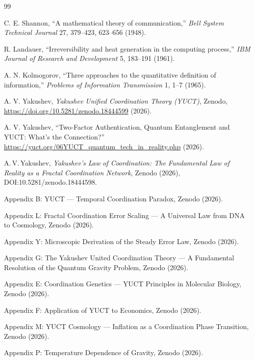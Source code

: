 \documentclass[12pt,a4paper]{article}
\theoremstyle{remark}
\begin{document}
	\begin{thebibliography}{99}
		
		C. E. Shannon, ``A mathematical theory of communication,'' \emph{Bell System Technical Journal} 27, 379--423, 623--656 (1948).
		
		R. Landauer, ``Irreversibility and heat generation in the computing process,'' \emph{IBM Journal of Research and Development} 5, 183--191 (1961).
		
		A. N. Kolmogorov, ``Three approaches to the quantitative definition of information,'' \emph{Problems of Information Transmission} 1, 1--7 (1965).
		
		A. V. Yakushev, \emph{Yakushev Unified Coordination Theory (YUCT)}, Zenodo, \url{https://doi.org/10.5281/zenodo.18444599} (2026).
		
		A. V. Yakushev, ``Two-Factor Authentication, Quantum Entanglement and YUCT: What's the Connection?'' \url{https://yuct.org/06YUCT_quantum_tech_in_reality.php} (2026).
		
		A.\,V.\,Yakushev, \emph{Yakushev's Law of Coordination: The Fundamental Law
			of Reality as a Fractal Coordination Network}, Zenodo (2026),
		DOI:10.5281/zenodo.18444598.
		
		Appendix B: YUCT --- Temporal Coordination Paradox, Zenodo (2026).
		
		Appendix L: Fractal Coordination Error Scaling --- A Universal Law from DNA to Cosmology, Zenodo (2026).
		
		Appendix Y: Microscopic Derivation of the Steady Error Law, Zenodo (2026).
		
		Appendix G: The Yakushev United Coordination Theory --- A Fundamental Resolution of the Quantum Gravity Problem, Zenodo (2026).
		
		Appendix E: Coordination Genetics --- YUCT Principles in Molecular Biology, Zenodo (2026).
		
		Appendix F: Application of YUCT to Economics, Zenodo (2026).
		
		Appendix M: YUCT Cosmology --- Inflation as a Coordination Phase Transition, Zenodo (2026).
		
		Appendix P: Temperature Dependence of Gravity, Zenodo (2026).
		

\end{thebibliography}
\end{document}
